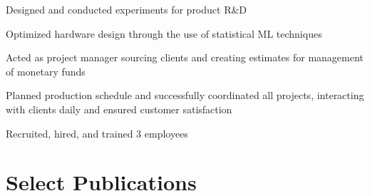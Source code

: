 \documentclass[]{deedy-resume-openfont}
\begin{document}
\begin{minipage}[t]{0.63\textwidth}
\begin{tightemize}
\item {Designed and conducted experiments for product R\&D}
\item {Optimized hardware design through the use of statistical ML techniques}
\end{tightemize}
\sectionsep

\begin{tightemize}
\item {Acted as project manager sourcing clients and creating estimates for management of monetary funds}
\item {Planned production schedule and successfully coordinated all projects, interacting with clients daily and ensured customer satisfaction}
\item {Recruited, hired, and trained 3 employees}
\end{tightemize}
\sectionsep

%
%



\section{Select Publications}
\renewcommand\refname{\vspace{-10mm}} %


\nocite{*}

\end{minipage}
\end{document}
